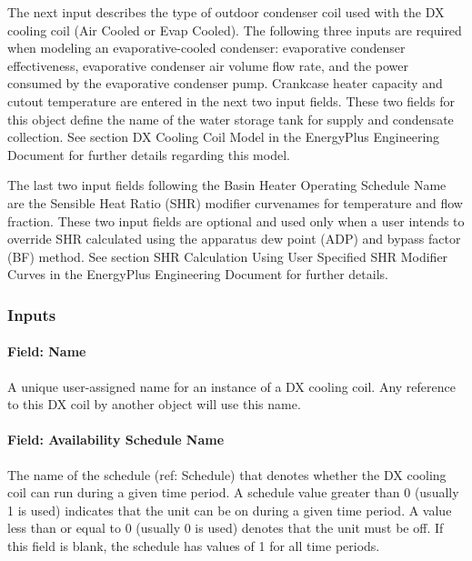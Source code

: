 The next input describes the type of outdoor condenser coil used with the DX cooling coil (Air Cooled or Evap Cooled). The following three inputs are required when modeling an evaporative-cooled condenser: evaporative condenser effectiveness, evaporative condenser air volume flow rate, and the power consumed by the evaporative condenser pump. Crankcase heater capacity and cutout temperature are entered in the next two input fields. These two fields for this object define the name of the water storage tank for supply and condensate collection. See section DX Cooling Coil Model in the EnergyPlus Engineering Document for further details regarding this model.

The last two input fields following the Basin Heater Operating Schedule Name are the Sensible Heat Ratio (SHR) modifier curvenames for temperature and flow fraction. These two input fields are optional and used only when a user intends to override SHR calculated using the apparatus dew point (ADP) and bypass factor (BF) method. See section SHR Calculation Using User Specified SHR Modifier Curves in the EnergyPlus Engineering Document for further details.

\subsubsection{Inputs}\label{inputs-13-004}

\paragraph{Field: Name}\label{field-name-12-003}

A unique user-assigned name for an instance of a DX cooling coil. Any reference to this DX coil by another object will use this name.

\paragraph{Field: Availability Schedule Name}\label{field-availability-schedule-name-6-001}

The name of the schedule (ref: Schedule) that denotes whether the DX cooling coil can run during a given time period. A schedule value greater than 0 (usually 1 is used) indicates that the unit can be on during a given time period. A value less than or equal to 0 (usually 0 is used) denotes that the unit must be off. If this field is blank, the schedule has values of 1 for all time periods.

